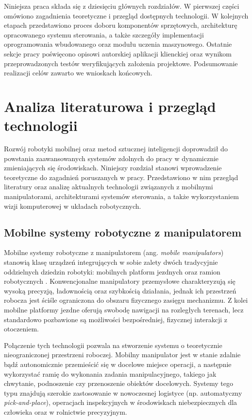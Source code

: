 \documentclass[11pt]{extreport}
\begin{document}
Niniejsza praca składa się z dziesięciu głównych rozdziałów. W pierwszej części omówiono zagadnienia teoretyczne i przegląd dostępnych technologii. W kolejnych etapach przedstawiono proces doboru komponentów sprzętowych, architekturę opracowanego systemu sterowania, a także szczegóły implementacji oprogramowania wbudowanego oraz modułu uczenia maszynowego. Ostatnie sekcje pracy poświęcono opisowi autorskiej aplikacji klienckiej oraz wynikom przeprowadzonych testów weryfikujących założenia projektowe. Podsumowanie realizacji celów zawarto we wnioskach końcowych.


\chapter{Analiza literaturowa i przegląd technologii}

Rozwój robotyki mobilnej oraz metod sztucznej inteligencji doprowadził do powstania zaawansowanych systemów zdolnych do pracy w dynamicznie zmieniających się środowiskach. Niniejszy rozdział stanowi wprowadzenie teoretyczne do zagadnień poruszanych w pracy. Przedstawiono w nim przegląd literatury oraz analizę aktualnych technologii związanych z mobilnymi manipulatorami, architekturami systemów sterowania, a także wykorzystaniem wizji komputerowej w układach robotycznych.

\section{Mobilne systemy robotyczne z manipulatorem}

Mobilne systemy robotyczne z manipulatorem (ang. \textit{mobile manipulators}) stanowią klasę urządzeń integrujących w sobie zalety dwóch tradycyjnie oddzielnych dziedzin robotyki: mobilnych platform jezdnych oraz ramion robotycznych \cite{siciliano2016springer}. Konwencjonalne manipulatory przemysłowe charakteryzują się wysoką precyzją, ładownością oraz szybkością działania, jednak ich przestrzeń robocza jest ściśle ograniczona do obszaru fizycznego zasięgu mechanizmu. Z kolei mobilne platformy jezdne oferują swobodę nawigacji na rozległych terenach, lecz standardowo pozbawione są możliwości bezpośredniej, fizycznej interakcji z otoczeniem.

Połączenie tych technologii pozwala na stworzenie systemu o teoretycznie nieograniczonej przestrzeni roboczej. Mobilny manipulator jest w stanie zdalnie bądź autonomicznie przemieścić się w docelowe miejsce operacji, a następnie wykorzystać ramię do wykonania zadania manipulacyjnego, takiego jak chwytanie, podnoszenie czy przenoszenie obiektów docelowych. Systemy tego typu znajdują szerokie zastosowanie w nowoczesnej logistyce (np. automatyczny \textit{pick-and-place}), operacjach inspekcyjnych w środowiskach niebezpiecznych dla człowieka oraz w rolnictwie precyzyjnym.
\end{document}
